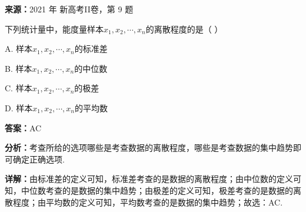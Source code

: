 \begin{question}[points=5]
\textbf{来源：}2021 年 新高考II卷，第 9 题\par
下列统计量中，能度量样本$x_1,x_2,\cdots,x_n$的离散程度的是（ ）
\begin{choices}
  \item A. 样本$x_1,x_2,\cdots,x_n$的标准差
  \item B. 样本$x_1,x_2,\cdots,x_n$的中位数
  \item C. 样本$x_1,x_2,\cdots,x_n$的极差
  \item D. 样本$x_1,x_2,\cdots,x_n$的平均数
\end{choices}
\begin{solution}
\textbf{答案：}AC

\textbf{分析：}考查所给的选项哪些是考查数据的离散程度，哪些是考查数据的集中趋势即可确定正确选项.

\textbf{详解：}由标准差的定义可知，标准差考查的是数据的离散程度；由中位数的定义可知，中位数考查的是数据的集中趋势；由极差的定义可知，极差考查的是数据的离散程度；由平均数的定义可知，平均数考查的是数据的集中趋势；故选：AC.
\end{solution}
\end{question}

